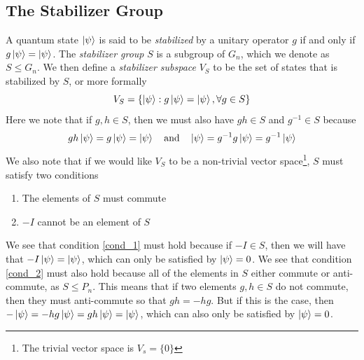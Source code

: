 \documentclass[11pt]{article}
\theoremstyle{definition}
\theoremstyle{plain}
\begin{document}
\subsection{The Stabilizer Group}
A quantum state $\ket{\psi}$ is said to be \emph{stabilized} by a unitary operator $g$ if and only if $g \ket{\psi} = \ket{\psi}$. The \emph{stabilizer group} $S$ is a subgroup of $G_n$, which we denote as $S \leq G_n$. We then define a \emph{stabilizer subspace} $V_S$ to be the set of states that is stabilized by $S$, or more formally
\begin{equation}
  V_S = \left\{ \ket{\psi} : g \ket{\psi} = \ket{\psi} , \forall g \in S \right\}  
\end{equation}
Here we note that if $g, h \in S$, then we must also have $gh \in S$ and $g^{-1} \in S$ because
\begin{equation}\label{stab_1}
  gh \ket{\psi} = g \ket{\psi} = \ket{\psi} \quad \text{and} \quad
  \ket{\psi} = g^{-1} g \ket{\psi} = g^{-1} \ket{\psi}
\end{equation} 
We also note that if we would like $V_S$ to be a non-trivial vector space\footnote{The trivial vector space is $V_s = \{0 \}$}, $S$ must satisfy two conditions
\begin{enumerate}[label = (\arabic*)]
\item\label{cond_1} The elements of $S$ must commute
\item\label{cond_2} $-I$ cannot be an element of $S$ 
\end{enumerate} 
We see that condition {\ref{cond_1}} must hold because if $-I \in S$, then we will have that $-I \ket{\psi} = \ket{\psi}$, which can only be satisfied by $\ket{\psi} = 0$. We see that condition {\ref{cond_2}} must also hold because all of the elements in $S$ either commute or anti-commute, as $S \leq P_n$. This means that if two elements $g, h \in S$ do not commute, then they must anti-commute so that $gh = -hg$. But if this is the case, then $-\ket{\psi} = -hg \ket{\psi} = gh \ket{\psi} = \ket{\psi}$, which can also only be satisfied by $\ket{\psi} = 0$.
\end{document}
